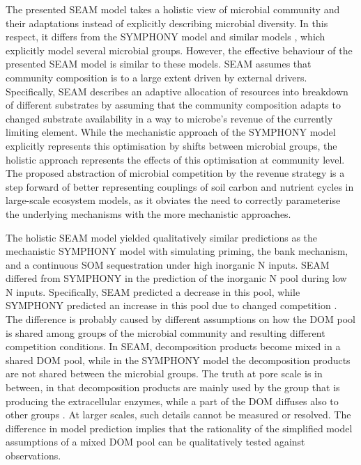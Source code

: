 The presented SEAM model takes a holistic view \citep{Panikov10} of microbial
community and their adaptations instead of explicitly describing microbial
diversity.
In this respect, it differs from the SYMPHONY model \citep{Perveen14} and
similar models \citep{Fontaine03}, which explicitly model several microbial
groups.
However, the effective behaviour of the presented SEAM model is similar to these
models.
SEAM assumes that community composition is to a large extent driven by external
drivers. Specifically, SEAM describes an adaptive allocation of resources into
breakdown of different substrates by assuming that the community composition
adapts to changed substrate availability in a way to   microbe's revenue of
the currently limiting element.
While the mechanistic approach of the SYMPHONY model explicitly represents this
optimisation by shifts between microbial groups, the holistic approach
represents the effects of this optimisation at community level. The proposed
abstraction of microbial competition by the revenue strategy is a step forward
of better representing couplings of soil carbon and nutrient cycles in
large-scale ecosystem models, as it obviates the need to correctly parameterise
the underlying mechanisms with the more mechanistic approaches.

The holistic SEAM model yielded qualitatively similar predictions as the
mechanistic SYMPHONY model with simulating priming, the bank mechanism, and a
continuous SOM sequestration under high inorganic N inputs. SEAM differed from
SYMPHONY in the prediction of the inorganic N pool during low N inputs.
Specifically, SEAM predicted a decrease in this pool, while SYMPHONY predicted an
increase in this pool due to changed competition \citep{Perveen14}. The
difference is probably caused by different assumptions on how the DOM pool is
shared among groups of the microbial community and resulting different
competition conditions. In SEAM, decomposition products become mixed
in a shared DOM pool, while in the SYMPHONY model the decomposition products are
not shared between the microbial groups.
The truth at pore scale is in between, in that decomposition products are mainly
used by the group that is producing the extracellular enzymes, while a part of
the DOM diffuses also to other groups \citep{Kaiser14}. At larger scales, such
details cannot be measured or resolved. The difference in model prediction
implies that the rationality of the simplified model assumptions of a mixed
DOM pool can be qualitatively tested against observations. 

